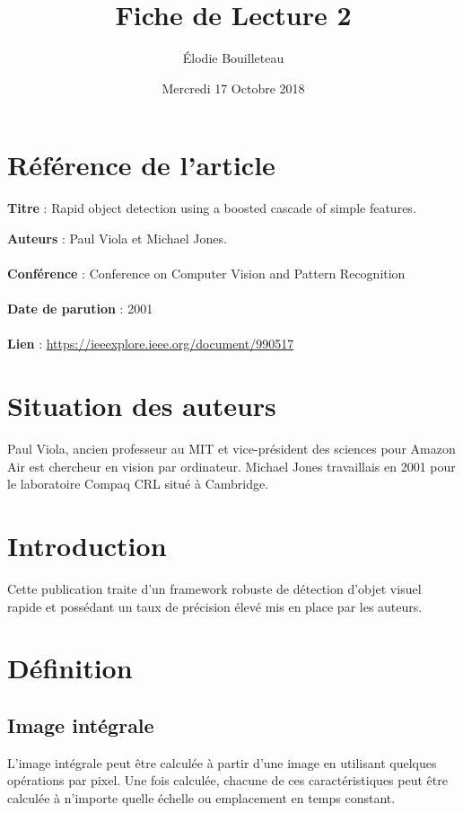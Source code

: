 \documentclass[11pt]{report}
\title{Fiche de Lecture 2}
\author{Élodie Bouilleteau}
\date{Mercredi 17 Octobre 2018}
\begin{document}
\maketitle
\renewcommand{\thesection}{\arabic{section}} 

\section{Référence de l'article}
	\begin{flushleft}
		\textbf{Titre} : Rapid object detection using a boosted cascade of simple features.
	\end{flushleft}
	\textbf{Auteurs} : Paul Viola et Michael Jones.\\\\
	\textbf{Conférence} : Conference on Computer Vision and Pattern Recognition\\\\
	\textbf{Date de parution} : 2001\\\\
	\textbf{Lien} : \url{https://ieeexplore.ieee.org/document/990517}
	
\section{Situation des auteurs}
Paul Viola, ancien professeur au MIT et vice-président des sciences pour
Amazon Air est chercheur en vision par ordinateur. Michael Jones travaillais
en 2001 pour le laboratoire Compaq CRL situé à Cambridge.

\section{Introduction}
Cette publication traite d’un framework robuste de détection d’objet
visuel rapide et possédant un taux de précision élevé mis en place par les
auteurs.

\section{Définition}
\subsection{Image intégrale}
L'image intégrale peut être calculée à partir d'une image en utilisant quelques opérations par pixel. Une fois calculée, chacune de ces caractéristiques peut être calculée à n'importe quelle échelle ou emplacement en temps constant.
\end{document}
